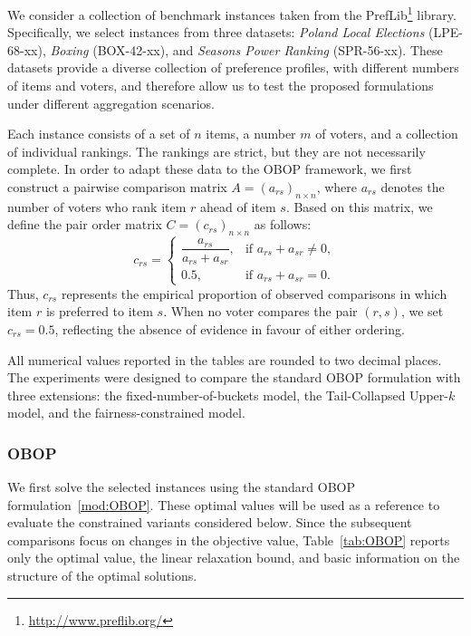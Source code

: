 \documentclass[pdflatex,basic,Numbered]{jnl}%
\theoremstyle{plain}
\theoremstyle{remark}
\theoremstyle{thmstyleone}%
\theoremstyle{thmstylethree}%
\begin{document}
We consider a collection of benchmark instances taken from the PrefLib\footnote{\url{http://www.preflib.org/}} library. Specifically, we select instances from three datasets: \textit{Poland Local Elections} (LPE-68-xx), \textit{Boxing} (BOX-42-xx), and \textit{Seasons Power Ranking} (SPR-56-xx). These datasets provide a diverse collection of preference profiles, with different numbers of items and voters, and therefore allow us to test the proposed formulations under different aggregation scenarios.

Each instance consists of a set of \(n\) items, a number \(m\) of voters, and a collection of individual rankings. The rankings are strict, but they are not necessarily complete. In order to adapt these data to the {\rm OBOP} framework, we first construct a pairwise comparison matrix \(A=(a_{rs})_{n\times n}\), where \(a_{rs}\) denotes the number of voters who rank item \(r\) ahead of item \(s\). Based on this matrix, we define the pair order matrix \(C=(c_{rs})_{n\times n}\) as follows:
\[
c_{rs} =
\begin{cases}
    \dfrac{a_{rs}}{a_{rs}+a_{sr}}, & \text{if } a_{rs}+a_{sr} \neq 0, \\[6pt]
    0.5, & \text{if } a_{rs}+a_{sr} = 0.
\end{cases}
\]
Thus, \(c_{rs}\) represents the empirical proportion of observed comparisons in which item \(r\) is preferred to item \(s\). When no voter compares the pair \((r,s)\), we set \(c_{rs}=0.5\), reflecting the absence of evidence in favour of either ordering.

All numerical values reported in the tables are rounded to two decimal places. The experiments were designed to compare the standard {\rm OBOP} formulation with three extensions: the fixed-number-of-buckets model, the Tail-Collapsed Upper-\(k\) model, and the fairness-constrained model.

\subsubsection{{\rm OBOP}}

We first solve the selected instances using the standard {\rm OBOP} formulation~\eqref{mod:OBOP}. These optimal values will be used as a reference to evaluate the constrained variants considered below. Since the subsequent comparisons focus on changes in the objective value, Table~\ref{tab:OBOP} reports only the optimal value, the linear relaxation bound, and basic information on the structure of the optimal solutions.
\end{document}
